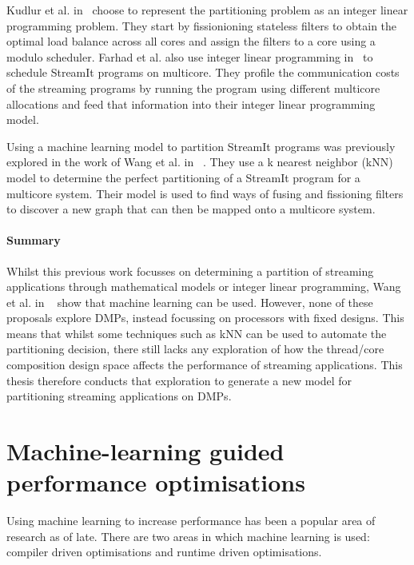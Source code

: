 Kudlur et al. in~\cite{kudlur2008orchestratingstreamprog} choose to represent the partitioning problem as an integer linear programming problem.
They start by fissionioning stateless filters to obtain the optimal load balance across all cores and assign the filters to a core using a modulo scheduler.
Farhad et al. also use integer linear programming in~\cite{farhad2012streamilp} to schedule StreamIt programs on multicore.
They profile the communication costs of the streaming programs by running the program using different multicore allocations and feed that information into their integer linear programming model.

Using a machine learning model to partition StreamIt programs was previously explored in the work of Wang et al. in ~\cite{wang2013partitionstreamit}.
They use a k nearest neighbor (kNN) model to determine the perfect partitioning of a StreamIt program for a multicore system. 
Their model is used to find ways of fusing and fissioning filters to discover a new graph that can then be mapped onto a multicore system.

\paragraph*{Summary}
Whilst this previous work focusses on determining a partition of streaming applications through mathematical models or integer linear programming, Wang et al. in ~\cite{wang2013partitionstreamit} show that machine learning can be used.
However, none of these proposals explore DMPs, instead focussing on processors with fixed designs.
This means that whilst some techniques such as kNN can be used to automate the partitioning decision, there still lacks any exploration of how the thread/core composition design space affects the performance of streaming applications.
This thesis therefore conducts that exploration to generate a new model for partitioning streaming applications on DMPs.
 

\section{Machine-learning guided performance optimisations}

Using machine learning to increase performance has been a popular area of research as of late.
There are two areas in which machine learning is used: compiler driven optimisations and runtime driven optimisations.

